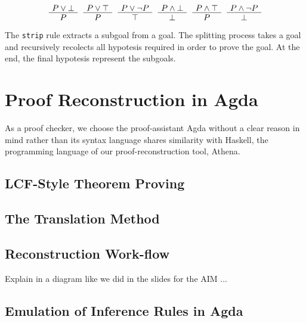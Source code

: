 \documentclass[runningheads,a4paper]{llncs}
\newenvironment{bprooftree}
  {\leavevmode\hbox\bgroup}
  {\DisplayProof\egroup}
\begin{document}
\[
\begin{bprooftree}
  \AxiomC{$P \vee \bot$}
  \UnaryInfC{$P$}
\end{bprooftree}
\begin{bprooftree}
\AxiomC{$P \vee \top$}
\UnaryInfC{$P$}
\end{bprooftree}
\begin{bprooftree}
\AxiomC{$P \vee \neg P$}
\UnaryInfC{$\top$}
\end{bprooftree}
\begin{bprooftree}
  \AxiomC{$P \wedge \bot$}
  \UnaryInfC{$\bot$}
\end{bprooftree}
\begin{bprooftree}
  \AxiomC{$P \wedge \top$}
  \UnaryInfC{$P$}
\end{bprooftree}
\begin{bprooftree}
  \AxiomC{$P \wedge \neg P$}
  \UnaryInfC{$\bot$}
\end{bprooftree}
\]

The \verb!strip! rule extracts a subgoal from a goal. The splitting process
takes a goal and recursively recolects all hypotesis required in order to prove the goal.
At the end, the final hypotesis represent the subgoals.




\section{Proof Reconstruction in Agda}
\label{secproofrecon}
As a proof checker, we choose the proof-assistant Agda without a clear reason in mind
rather than its syntax language shares similarity with Haskell, the programming language
of our proof-reconstruction tool, Athena.



\subsection{LCF-Style Theorem Proving}

\subsection{The Translation Method}
\subsection{Reconstruction Work-flow}
Explain in a diagram like we did in the slides for the AIM ...

\subsection{Emulation of Inference Rules in Agda}
\end{document}
